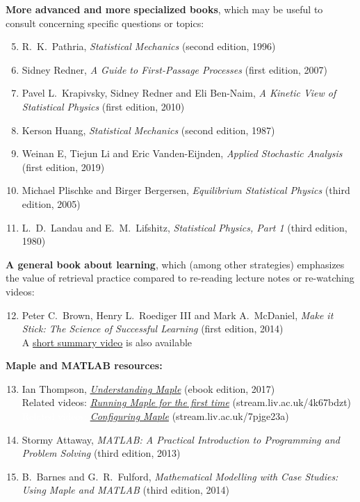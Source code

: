 \noindent\textbf{More advanced and more specialized books}, which may be useful to consult concerning specific questions or topics: \\[-24 pt]
\begin{enumerate}
  \setcounter{enumi}{4}
  \item R.~K.~Pathria, \textit{Statistical Mechanics} (second edition, 1996)
  \item Sidney Redner, \textit{A Guide to First-Passage Processes} (first edition, 2007)
  \item Pavel L.~Krapivsky, Sidney Redner and Eli Ben-Naim, \textit{A Kinetic View of Statistical Physics} (first edition, 2010)
  \item Kerson Huang, \textit{Statistical Mechanics} (second edition, 1987)
  \item Weinan E, Tiejun Li and Eric Vanden-Eijnden, \textit{Applied Stochastic Analysis} (first edition, 2019)
  \item Michael Plischke and Birger Bergersen, \textit{Equilibrium Statistical Physics} (third edition, 2005)
  \item L.~D.~Landau and E.~M.~Lifshitz, \textit{Statistical Physics, Part 1} (third edition, 1980)
\end{enumerate}

\newpage %
\noindent\textbf{A general book about learning}, which (among other strategies) emphasizes the value of retrieval practice compared to re-reading lecture notes or re-watching videos: \\[-24 pt]
\begin{enumerate}
  \setcounter{enumi}{11}
  \item Peter C.~Brown, Henry L.~Roediger III and Mark A.~McDaniel, \textit{Make it Stick: The Science of Successful Learning} (first edition, 2014) \\
        A \href{https://www.youtube.com/watch?v=MfylloWuuZU}{short summary video} is also available
\end{enumerate}

\noindent\textbf{Maple and MATLAB resources:} \\[-24 pt]
\begin{enumerate}
  \setcounter{enumi}{12}
  \item Ian Thompson, \href{https://library.liv.ac.uk/record=b4395758~S8}{\textit{Understanding Maple}} (ebook edition, 2017) \\
        Related videos: \href{https://stream.liv.ac.uk/4k67bdzt}{\textit{Running Maple for the first time}} (stream.liv.ac.uk/4k67bdzt) \\
        \textcolor{white}{Related videos:} \href{https://stream.liv.ac.uk/7pjge23a}{\textit{Configuring Maple}} (stream.liv.ac.uk/7pjge23a)
  \item Stormy Attaway, \textit{MATLAB: A Practical Introduction to Programming and Problem Solving} (third edition, 2013)
  \item B.~Barnes and G.~R.~Fulford, \textit{Mathematical Modelling with Case Studies: Using Maple and MATLAB} (third edition, 2014)
\end{enumerate}

